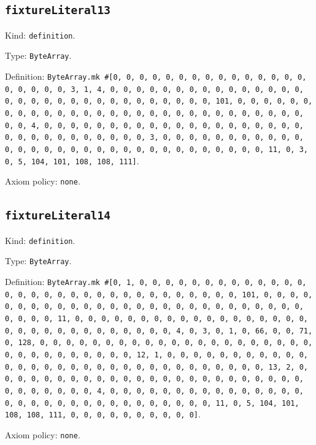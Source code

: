 \documentclass[11pt]{article}
\begin{document}
\subsection*{\texttt{fixtureLiteral13}}
\noindent Kind: \texttt{definition}.\par
\noindent Type: \texttt{ByteArray}.\par
\noindent Definition: \texttt{ByteArray.mk \#[0, 0, 0, 0, 0, 0, 0, 0, 0, 0, 0, 0, 0, 0, 0, 0, 0, 0, 0, 0, 3, 1, 4, 0, 0, 0, 0, 0, 0, 0, 0, 0, 0, 0, 0, 0, 0, 0, 0, 0, 0, 0, 0, 0, 0, 0, 0, 0, 0, 0, 0, 0, 0, 0, 101, 0, 0, 0, 0, 0, 0, 0, 0, 0, 0, 0, 0, 0, 0, 0, 0, 0, 0, 0, 0, 0, 0, 0, 0, 0, 0, 0, 0, 0, 0, 0, 4, 0, 0, 0, 0, 0, 0, 0, 0, 0, 0, 0, 0, 0, 0, 0, 0, 0, 0, 0, 0, 0, 0, 0, 0, 0, 0, 0, 0, 0, 0, 0, 3, 0, 0, 0, 0, 0, 0, 0, 0, 0, 0, 0, 0, 0, 0, 0, 0, 0, 0, 0, 0, 0, 0, 0, 0, 0, 0, 0, 0, 0, 0, 0, 11, 0, 3, 0, 5, 104, 101, 108, 108, 111]}.\par
\noindent Axiom policy: \texttt{none}.\par
\subsection*{\texttt{fixtureLiteral14}}
\noindent Kind: \texttt{definition}.\par
\noindent Type: \texttt{ByteArray}.\par
\noindent Definition: \texttt{ByteArray.mk \#[0, 1, 0, 0, 0, 0, 0, 0, 0, 0, 0, 0, 0, 0, 0, 0, 0, 0, 0, 0, 0, 0, 0, 0, 0, 0, 0, 0, 0, 0, 0, 0, 0, 101, 0, 0, 0, 0, 0, 0, 0, 0, 0, 0, 0, 0, 0, 0, 0, 0, 0, 0, 0, 0, 0, 0, 0, 0, 0, 0, 0, 0, 0, 0, 0, 11, 0, 0, 0, 0, 0, 0, 0, 0, 0, 0, 0, 0, 0, 0, 0, 0, 0, 0, 0, 0, 0, 0, 0, 0, 0, 0, 0, 0, 0, 0, 0, 4, 0, 3, 0, 1, 0, 66, 0, 0, 71, 0, 128, 0, 0, 0, 0, 0, 0, 0, 0, 0, 0, 0, 0, 0, 0, 0, 0, 0, 0, 0, 0, 0, 0, 0, 0, 0, 0, 0, 0, 0, 0, 0, 12, 1, 0, 0, 0, 0, 0, 0, 0, 0, 0, 0, 0, 0, 0, 0, 0, 0, 0, 0, 0, 0, 0, 0, 0, 0, 0, 0, 0, 0, 0, 0, 0, 13, 2, 0, 0, 0, 0, 0, 0, 0, 0, 0, 0, 0, 0, 0, 0, 0, 0, 0, 0, 0, 0, 0, 0, 0, 0, 0, 0, 0, 0, 0, 0, 0, 4, 0, 0, 0, 0, 0, 0, 0, 0, 0, 0, 0, 0, 0, 0, 0, 0, 0, 0, 0, 0, 0, 0, 0, 0, 0, 0, 0, 0, 0, 0, 0, 11, 0, 5, 104, 101, 108, 108, 111, 0, 0, 0, 0, 0, 0, 0, 0, 0, 0]}.\par
\noindent Axiom policy: \texttt{none}.\par
\end{document}
